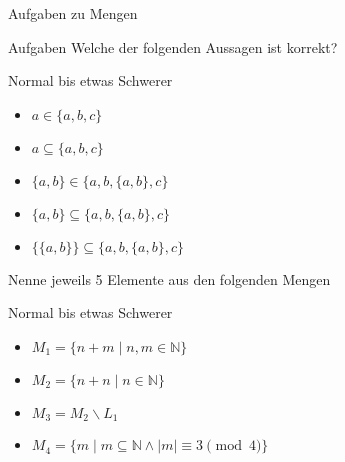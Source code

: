 {
\begin{frame}[fragile]{Aufgaben zu Mengen}
    \begin{alertblock}{Aufgaben}
        Welche der folgenden Aussagen ist korrekt?
    \end{alertblock}
    \begin{block}{Normal bis etwas Schwerer}
        \begin{minipage}[t]{0.45\textwidth}
            \begin{itemize}
                \item $a \in \{a, b, c\}$
                \item $a \subseteq \{a, b, c\}$
                \item $\{a,b\} \in \{a, b, \{a, b\}, c\}$
            \end{itemize}
        \end{minipage}
        \begin{minipage}[t]{0.45\textwidth}
            \begin{itemize}
                \item $\{a,b\} \subseteq \{a, b, \{a, b\}, c\}$
                \item $\{\{a,b\}\} \subseteq \{a, b, \{a, b\}, c\}$
            \end{itemize}
        \end{minipage}
    \end{block}
    Nenne jeweils 5 Elemente aus den folgenden Mengen
    \begin{block}{Normal bis etwas Schwerer}
        \begin{itemize}
            \item $M_1 = \{n+m \mid n, m \in \mathbb{N}\}$
            \item $M_2 = \{n+n \mid n \in \mathbb{N}\}$
            \item $M_3 = M_2 \backslash L_1$
            \item $M_4 = \{m \mid m\subseteq \mathbb{N} \land |m|\equiv 3 \pmod 4\}$
        \end{itemize}
    \end{block}
\end{frame}
}

